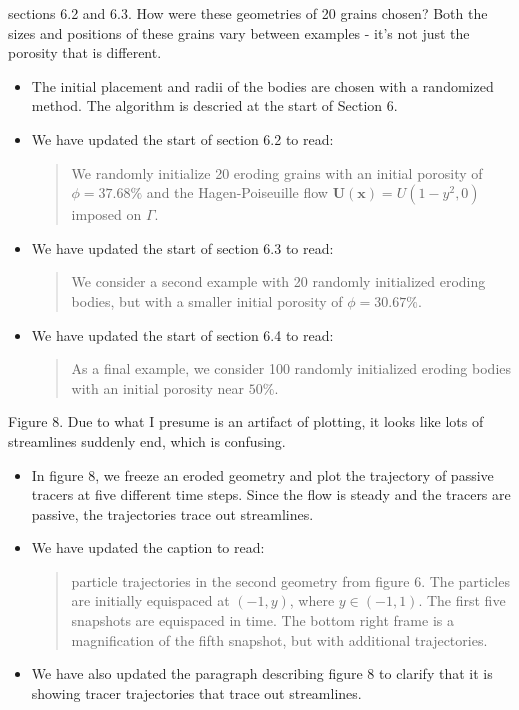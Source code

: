 \documentclass[11pt]{article}
\newcommand{\comment}[1]{{\color{blue} #1}}
\begin{document}
\noindent
\comment{sections 6.2 and 6.3.  How were these geometries of 20 grains
chosen?  Both the sizes and positions of these grains vary between
examples - it's not just the porosity that is different.}
\begin{itemize}
  \item The initial placement and radii of the bodies are chosen with a
    randomized method. The algorithm is descried at the start of Section
    6.

  \item We have updated the start of section 6.2 to read:
    \begin{quotation}
      \noindent
      We randomly initialize 20 eroding grains with an initial porosity
      of $\phi = 37.68\%$ and the Hagen-Poiseuille flow
      $\mathbf{U}(\mathbf{x}) = U (1-y^2, 0)$ imposed on $\Gamma$.
    \end{quotation}


  \item We have updated the start of section 6.3 to read:
    \begin{quotation}
      \noindent
      We consider a second example with 20 randomly initialized eroding
      bodies, but with a smaller initial porosity of $\phi = 30.67\%$.
    \end{quotation}


  \item We have updated the start of section 6.4 to read:
    \begin{quotation}
      \noindent
        As a final example, we consider 100 randomly initialized eroding
        bodies with an initial porosity near $50\%$.
    \end{quotation}

\end{itemize}




\noindent
\comment{Figure 8.  Due to what I presume is an artifact of plotting, it
looks like lots of streamlines suddenly end, which is confusing.}
\begin{itemize}
  \item In figure 8, we freeze an eroded geometry and plot the
    trajectory of passive tracers at five different time steps. Since
    the flow is steady and the tracers are passive, the trajectories
    trace out streamlines.

  \item We have updated the caption to read:
    \begin{quotation}
       particle trajectories in the second geometry from figure 6.
      The particles are initially equispaced at $(−1,y)$, where $y \in
      (-1, 1)$. The first five snapshots are equispaced in time. The
      bottom right frame is a magnification of the fifth snapshot, but
      with additional trajectories.
    \end{quotation}

  \item We have also updated the paragraph describing figure 8 to
    clarify that it is showing tracer trajectories that trace out
    streamlines.
\end{itemize}
\end{document}
